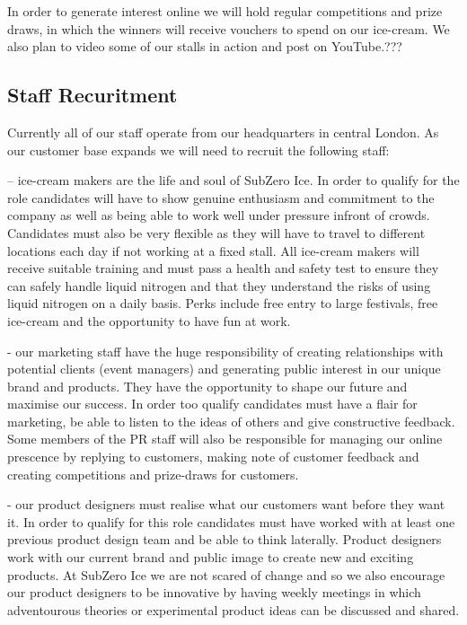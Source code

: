 \documentclass{article}
\begin{document}
In order to generate interest online we will hold regular competitions
and prize draws, in which the winners will receive vouchers to spend on
our ice-cream. We also plan to video some of our stalls in action and
post on YouTube.???

  \subsection{Staff Recuritment}

  Currently all of our staff operate from our headquarters in central London. As our customer base expands we will need to recruit the following staff:

  – ice-cream makers are the life and soul of SubZero Ice. In order to qualify for the role candidates will have to show genuine enthusiasm and commitment to the company as well as being able to work well under pressure infront of crowds. Candidates must also be very flexible as they will have to travel to different locations each day if not working at a fixed stall. All ice-cream makers will receive suitable training and must pass a health and safety test to ensure they can safely handle liquid nitrogen and that they understand the risks of using liquid nitrogen on a daily basis. Perks include free entry to large festivals, free ice-cream and the opportunity to have fun at work.

  - our marketing staff have the huge responsibility of creating relationships with potential clients (event managers) and generating public interest in our unique brand and products. They have the opportunity to shape our future and maximise our success. In order too qualify candidates must have a flair for marketing, be able to listen to the ideas of others and give constructive feedback. Some members of the PR staff will also be responsible for managing our online prescence by replying to customers, making note of customer feedback and creating competitions and prize-draws for customers.

 - our product designers must realise what our customers want before they want it. In order to qualify for this role candidates must have worked with at least one previous product design team and be able to think laterally. Product designers work with our current brand and public image to create new and exciting products. At SubZero Ice we are not scared of change and so we also encourage our product designers to be innovative by having weekly meetings in which adventourous theories or experimental product ideas can be discussed and shared.
\end{document}
